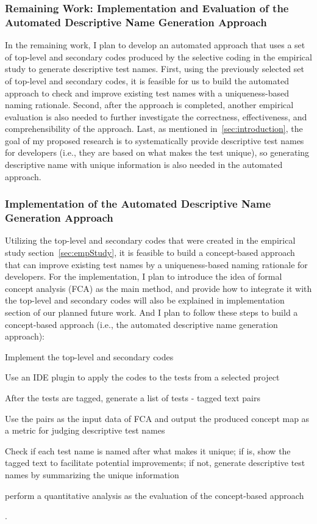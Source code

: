 \subsubsection{Remaining Work: Implementation and Evaluation of the Automated Descriptive Name Generation Approach}
\label{sec:remaining-work}

In the remaining work, I plan to develop an automated approach that uses a set of top-level and secondary codes produced by the selective coding in the empirical study to generate descriptive test names.
%
First, using the previously selected set of top-level and secondary codes, it is feasible for us to build the automated approach to check and improve existing test names with a uniqueness-based naming rationale.
%
Second, after the approach is completed, another empirical evaluation is also needed to further investigate the correctness, effectiveness, and comprehensibility of the approach.
%
Last, as mentioned in~\cref{sec:introduction}, the goal of my proposed research is to systematically provide descriptive test names for developers (i.e., they are based on what makes the test unique), so generating descriptive name with unique information is also needed in the automated approach.

\subsubsection{Implementation of the Automated Descriptive Name Generation Approach}

Utilizing the top-level and secondary codes that were created in the empirical study section~\cref{sec:empStudy}, it is feasible to build a concept-based approach that can improve existing test names by a uniqueness-based naming rationale for developers.
%
For the implementation, I plan to introduce the idea of formal concept analysis (FCA) as the main method, and provide how to integrate it with the top-level and secondary codes will also be explained in implementation section of our planned future work.
%
And I plan to follow these steps to build a concept-based approach (i.e., the automated descriptive name generation approach):
\begin{enumerate*}
    \item Implement the top-level and secondary codes
    \item Use an IDE plugin to apply the codes to the tests from a selected project
    \item After the tests are tagged, generate a list of tests - tagged text pairs
    \item Use the pairs as the input data of FCA and output the produced concept map as a metric for judging descriptive test names
    \item Check if each test name is named after what makes it unique; if is, show the tagged text to facilitate potential improvements; if not, generate descriptive test names by summarizing the unique information
    \item perform a quantitative analysis as the evaluation of the concept-based approach
\end{enumerate*}.


